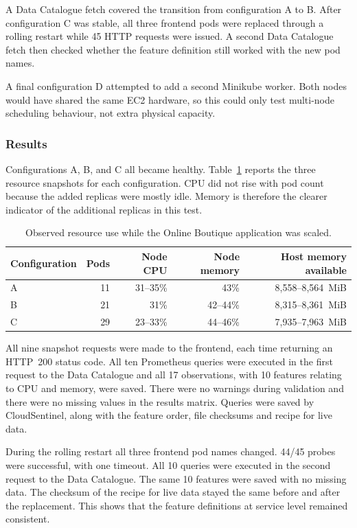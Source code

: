 A Data Catalogue fetch covered the transition from configuration A to B. After configuration C was stable, all three frontend pods were replaced through a rolling restart while 45 HTTP requests were issued. A second Data Catalogue fetch then checked whether the feature definition still worked with the new pod names.

A final configuration D attempted to add a second Minikube worker. Both nodes would have shared the same EC2 hardware, so this could only test multi-node scheduling behaviour, not extra physical capacity.

\subsubsection{Results}

Configurations A, B, and C all became healthy. Table~\ref{tab:h9-topology-scaling-results} reports the three resource snapshots for each configuration. CPU did not rise with pod count because the added replicas were mostly idle. Memory is therefore the clearer indicator of the additional replicas in this test.

\begin{table}[H]
    \centering
    \small
    \caption{Observed resource use while the Online Boutique application was scaled.}
    \label{tab:h9-topology-scaling-results}
    \begin{tabular}{@{}lrrrr@{}}
        \toprule
        Configuration & Pods & Node CPU & Node memory & Host memory available \\
        \midrule
        A & 11 & 31--35\% & 43\% & 8,558--8,564~MiB \\
        B & 21 & 31\% & 42--44\% & 8,315--8,361~MiB \\
        C & 29 & 23--33\% & 44--46\% & 7,935--7,963~MiB \\
        \bottomrule
    \end{tabular}
\end{table}

All nine snapshot requests were made to the frontend, each time returning an HTTP~200 status code. All ten Prometheus queries were executed in the first request to the Data Catalogue and all 17 observations, with 10 features relating to CPU and memory, were saved. There were no warnings during validation and there were no missing values in the results matrix. Queries were saved by CloudSentinel, along with the feature order, file checksums and recipe for live data.

During the rolling restart all three frontend pod names changed. 44/45 probes were successful, with one timeout. All 10 queries were executed in the second request to the Data Catalogue. The same 10 features were saved with no missing data. The checksum of the recipe for live data stayed the same before and after the replacement. This shows that the feature definitions at service level remained consistent.

